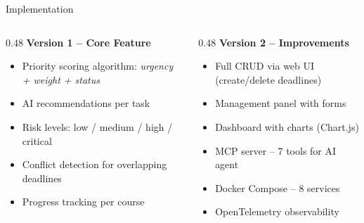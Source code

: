 \documentclass[10pt,aspectratio=169]{beamer}
\begin{document}
{
\begin{frame}{Implementation}
    \vspace{2pt}

    \begin{columns}[T]
        \begin{column}{0.48\textwidth}
            \textcolor{accentblue}{\textbf{\large Version 1 -- Core Feature}}
            \vspace{4pt}
            \begin{itemize}
                \itemsep 4pt
                \item Priority scoring algorithm: \emph{urgency + weight + status}
                \item AI recommendations per task
                \item Risk levels: low / medium / high / critical
                \item Conflict detection for overlapping deadlines
                \item Progress tracking per course
            \end{itemize}
        \end{column}
        \begin{column}{0.48\textwidth}
            \textcolor{accentgreen}{\textbf{\large Version 2 -- Improvements}}
            \vspace{4pt}
            \begin{itemize}
                \itemsep 4pt
                \item Full CRUD via web UI (create/delete deadlines)
                \item Management panel with forms
                \item Dashboard with charts (Chart.js)
                \item MCP server -- 7 tools for AI agent
                \item Docker Compose -- 8 services
                \item OpenTelemetry observability
            \end{itemize}
        \end{column}
    \end{columns}


\end{frame}}
\end{document}
